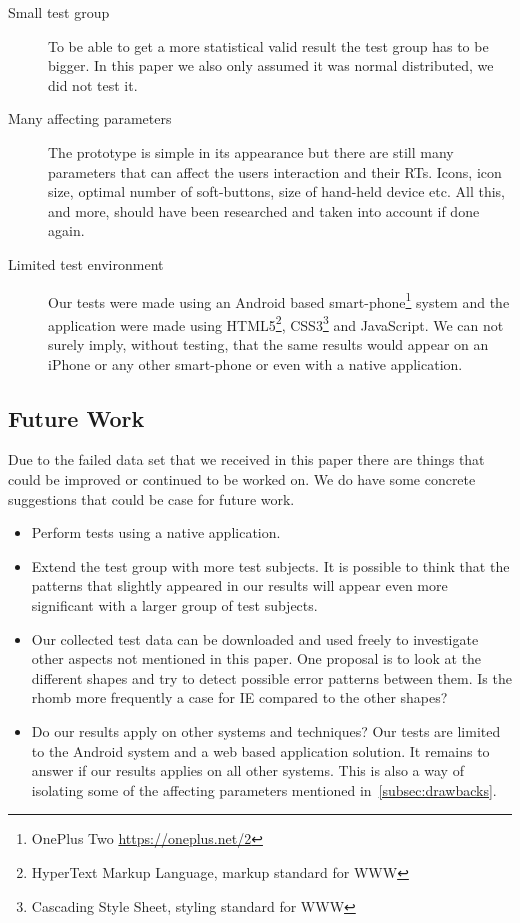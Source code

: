 \documentclass[runningheads,a4paper]{llncs}
\begin{document}
\begin{description}
	\item[Small test group] To be able to get a more statistical valid result the test group has to be bigger. In this paper we also only assumed it was normal distributed, we did not test it.
	\item[Many affecting parameters] The prototype is simple in its appearance but there are still many parameters that can affect the users interaction and their RTs. Icons, icon size, optimal number of soft-buttons, size of hand-held device etc. All this, and more, should have been researched and taken into account if done again. 
	\item[Limited test environment] Our tests were made using an Android based smart-phone\footnote{OnePlus Two \url{https://oneplus.net/2}} system and the application were made using HTML5\footnote{HyperText Markup Language, markup standard for WWW}, CSS3\footnote{Cascading Style Sheet, styling standard for WWW} and JavaScript. We can not surely imply, without testing, that the same results would appear on an iPhone or any other smart-phone or even with a native application.
\end{description}

\subsection{Future Work}
Due to the failed data set that we received in this paper there are things that could be improved or continued to be worked on. 
We do have some concrete suggestions that could be case for future work. 

\begin{itemize}
	\item Perform tests using a native application.
	\item Extend the test group with more test subjects. It is possible to think that the patterns that slightly appeared in our results will appear even more significant with a larger group of test subjects.
	\item Our collected test data can be downloaded and used freely to investigate other aspects not mentioned in this paper. One proposal is to look at the different shapes and try to detect possible error patterns between them. Is the rhomb more frequently a case for IE compared to the other shapes?
	\item Do our results apply on other systems and techniques? Our tests are limited to the Android system and a web based application solution. It remains to answer if our results applies on all other systems. This is also a way of isolating some of the affecting parameters mentioned in~\ref{subsec:drawbacks}.
\end{itemize}
\end{document}
